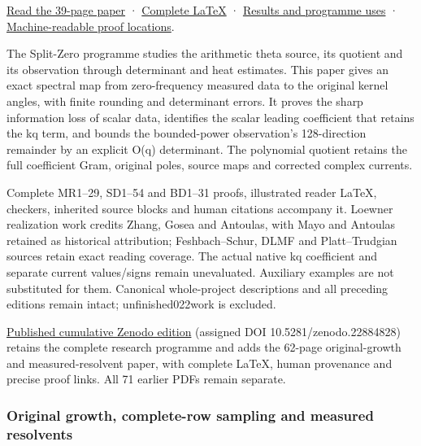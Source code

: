 \documentclass[
]{article}
\begin{document}
\href{https://github.com/KokunoYumeto/zeta-function-research-reader/blob/main/workbenches/splitzero-tandem/continuations/20260922-original-observation-recovery/ORIGINAL_OBSERVATION_RECOVERY_READER.pdf}{Read
the 39-page paper} ·
\href{https://github.com/KokunoYumeto/zeta-function-research-reader/blob/main/workbenches/splitzero-tandem/continuations/20260922-original-observation-recovery/ORIGINAL_OBSERVATION_RECOVERY_READER.tex}{Complete
LaTeX} ·
\href{https://github.com/KokunoYumeto/zeta-function-research-reader/blob/main/workbenches/splitzero-tandem/continuations/20260922-original-observation-recovery/RESULTS_20260922_021.md}{Results
and programme uses} ·
\href{https://github.com/KokunoYumeto/zeta-function-research-reader/blob/main/workbenches/splitzero-tandem/continuations/20260922-original-observation-recovery/RESULT_INDEX.json}{Machine-readable
proof locations}.

The Split-Zero programme studies the arithmetic theta source, its
quotient and its observation through determinant and heat estimates.
This paper gives an exact spectral map from zero-frequency measured data
to the original kernel angles, with finite rounding and determinant
errors. It proves the sharp information loss of scalar data, identifies
the scalar leading coefficient that retains the kq term, and bounds the
bounded-power observation's 128-direction remainder by an explicit O(q)
determinant. The polynomial quotient retains the full coefficient Gram,
original poles, source maps and corrected complex currents.

Complete MR1--29, SD1--54 and BD1--31 proofs, illustrated reader LaTeX,
checkers, inherited source blocks and human citations accompany it.
Loewner realization work credits Zhang, Gosea and Antoulas, with Mayo
and Antoulas retained as historical attribution; Feshbach--Schur, DLMF
and Platt--Trudgian sources retain exact reading coverage. The actual
native kq coefficient and separate current values/signs remain
unevaluated. Auxiliary examples are not substituted for them. Canonical
whole-project descriptions and all preceding editions remain intact;
unfinished022work is excluded.

\href{https://zenodo.org/records/22884828}{Published cumulative Zenodo
edition} (assigned DOI 10.5281/zenodo.22884828) retains the complete
research programme and adds the 62-page original-growth and
measured-resolvent paper, with complete LaTeX, human provenance and
precise proof links. All 71 earlier PDFs remain separate.

\subsubsection{Original growth, complete-row sampling and measured
resolvents}\label{original-growth-complete-row-sampling-and-measured-resolvents}
\end{document}

